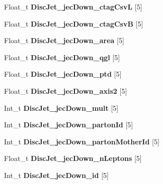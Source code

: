 \begin{DoxyCompactItemize}
Float\+\_\+t {\bfseries Disc\+Jet\+\_\+jec\+Down\+\_\+ctag\+CsvL} \mbox{[}5\mbox{]}
\item 
\hypertarget{classMiniTree_af0578ed509e3beb2c9605210fd36d9d7}{}\label{classMiniTree_af0578ed509e3beb2c9605210fd36d9d7} 
Float\+\_\+t {\bfseries Disc\+Jet\+\_\+jec\+Down\+\_\+ctag\+CsvB} \mbox{[}5\mbox{]}
\item 
\hypertarget{classMiniTree_a06727d39d24611b59a0c42e8701303a6}{}\label{classMiniTree_a06727d39d24611b59a0c42e8701303a6} 
Float\+\_\+t {\bfseries Disc\+Jet\+\_\+jec\+Down\+\_\+area} \mbox{[}5\mbox{]}
\item 
\hypertarget{classMiniTree_a5e71d24a454bbd694d85811c5669a54e}{}\label{classMiniTree_a5e71d24a454bbd694d85811c5669a54e} 
Float\+\_\+t {\bfseries Disc\+Jet\+\_\+jec\+Down\+\_\+qgl} \mbox{[}5\mbox{]}
\item 
\hypertarget{classMiniTree_a929667ac9a60e7d34677d81e9188dae6}{}\label{classMiniTree_a929667ac9a60e7d34677d81e9188dae6} 
Float\+\_\+t {\bfseries Disc\+Jet\+\_\+jec\+Down\+\_\+ptd} \mbox{[}5\mbox{]}
\item 
\hypertarget{classMiniTree_a1bec95962be0129d7f3ffcb60fddf301}{}\label{classMiniTree_a1bec95962be0129d7f3ffcb60fddf301} 
Float\+\_\+t {\bfseries Disc\+Jet\+\_\+jec\+Down\+\_\+axis2} \mbox{[}5\mbox{]}
\item 
\hypertarget{classMiniTree_a6f66b310c82e19d76584b9ebed029ec6}{}\label{classMiniTree_a6f66b310c82e19d76584b9ebed029ec6} 
Int\+\_\+t {\bfseries Disc\+Jet\+\_\+jec\+Down\+\_\+mult} \mbox{[}5\mbox{]}
\item 
\hypertarget{classMiniTree_ad3bd1183fabab08ec1645c6ca4d690e5}{}\label{classMiniTree_ad3bd1183fabab08ec1645c6ca4d690e5} 
Int\+\_\+t {\bfseries Disc\+Jet\+\_\+jec\+Down\+\_\+parton\+Id} \mbox{[}5\mbox{]}
\item 
\hypertarget{classMiniTree_a364123da16c0747dcef75ebae08ea9f9}{}\label{classMiniTree_a364123da16c0747dcef75ebae08ea9f9} 
Int\+\_\+t {\bfseries Disc\+Jet\+\_\+jec\+Down\+\_\+parton\+Mother\+Id} \mbox{[}5\mbox{]}
\item 
\hypertarget{classMiniTree_ae0eec37da1d57d45ba2d3ece9c8ce27d}{}\label{classMiniTree_ae0eec37da1d57d45ba2d3ece9c8ce27d} 
Float\+\_\+t {\bfseries Disc\+Jet\+\_\+jec\+Down\+\_\+n\+Leptons} \mbox{[}5\mbox{]}
\item 
\hypertarget{classMiniTree_a6af25e5cb03aa4c972ffccd548a37557}{}\label{classMiniTree_a6af25e5cb03aa4c972ffccd548a37557} 
Int\+\_\+t {\bfseries Disc\+Jet\+\_\+jec\+Down\+\_\+id} \mbox{[}5\mbox{]}
\item 

\end{DoxyCompactItemize}
